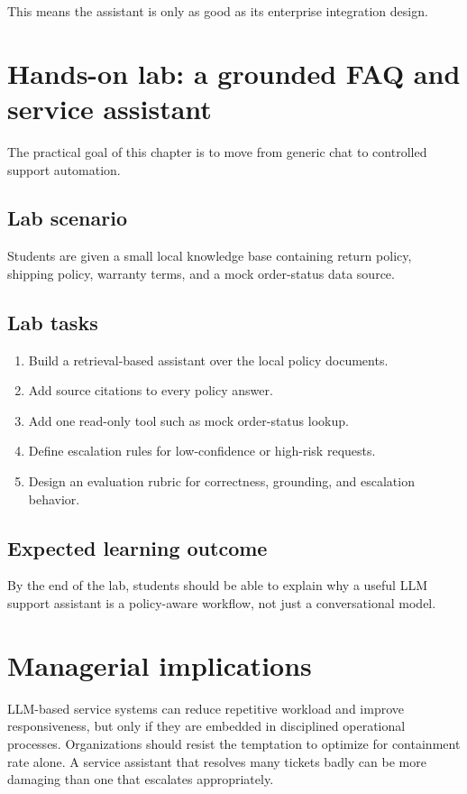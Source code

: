 This means the assistant is only as good as its enterprise integration design.

\section{Hands-on lab: a grounded FAQ and service assistant}
The practical goal of this chapter is to move from generic chat to controlled support automation.

\subsection{Lab scenario}
Students are given a small local knowledge base containing return policy, shipping policy, warranty terms, and a mock order-status data source.

\subsection{Lab tasks}
\begin{enumerate}
  \item Build a retrieval-based assistant over the local policy documents.
  \item Add source citations to every policy answer.
  \item Add one read-only tool such as mock order-status lookup.
  \item Define escalation rules for low-confidence or high-risk requests.
  \item Design an evaluation rubric for correctness, grounding, and escalation behavior.
\end{enumerate}

\subsection{Expected learning outcome}
By the end of the lab, students should be able to explain why a useful LLM support assistant is a policy-aware workflow, not just a conversational model.

\section{Managerial implications}
LLM-based service systems can reduce repetitive workload and improve responsiveness, but only if they are embedded in disciplined operational processes.
Organizations should resist the temptation to optimize for containment rate alone.
A service assistant that resolves many tickets badly can be more damaging than one that escalates appropriately.


